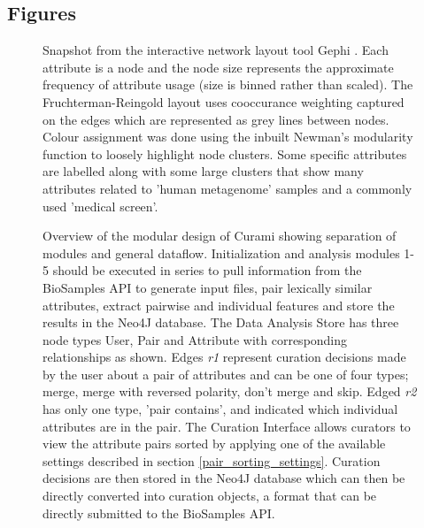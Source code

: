 \documentclass{bmcart}
\begin{document}
\begin{backmatter}

\section*{Figures}

  \begin{figure}[h!]
  \caption{ 
  Snapshot from the interactive network layout tool Gephi \cite{bastian2009gephi}. Each attribute is a node and the node size represents the approximate frequency of attribute usage (size is binned rather than scaled). The Fruchterman-Reingold layout \cite{fruchterman1991graph} uses cooccurance weighting captured on the edges which are represented as grey lines between nodes. Colour assignment was done using the inbuilt Newman's modularity function \cite{newman2006modularity} to loosely highlight node clusters. Some specific attributes  are labelled along with some large clusters that show many attributes related to 'human metagenome' samples and a commonly used 'medical screen'.
  }
\label{fig:gephi}
\end{figure}

  \begin{figure}[h!]
  \caption{
      Overview of the modular design of Curami showing separation of modules and general dataflow. Initialization and analysis modules 1-5 should be executed in series to pull information from the BioSamples API to generate input files, pair lexically similar attributes, extract pairwise and individual features and store the results in the Neo4J database. The Data Analysis Store has three node types User, Pair and Attribute with corresponding relationships as shown. Edges \textit{r1} represent curation decisions made by the user about a pair of attributes and can be one of four types; merge, merge with reversed polarity, don't merge and skip. Edged \textit{r2} has only one type, 'pair contains', and indicated which individual attributes are in the pair. The Curation Interface allows curators to view the attribute pairs sorted by applying one of the available settings described in section \ref{pair_sorting_settings}. Curation decisions are then stored in the Neo4J database which can then be directly converted into curation objects, a format that can be directly submitted to the BioSamples API.}
\label{fig:workflow}
\end{figure}



\end{backmatter}
\end{document}
